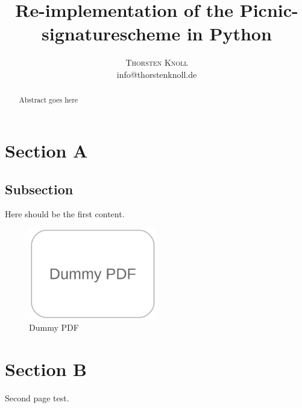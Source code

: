 \documentclass[twoside]{article}
\title{\vspace{-7mm}%
	\fontsize{24pt}{10pt}\selectfont
	\textbf{Re-implementation of the Picnic-signaturescheme in Python}
	}
\author{%
	\large
	\textsc{Thorsten Knoll} \\[2mm]
	\normalsize	info@thorstenknoll.de
	\vspace{-5mm}
	}
\date{}
\begin{document}
\maketitle
\thispagestyle{fancy}

\begin{abstract}
\noindent Abstract goes here
\end{abstract}

\section{Section A}
\subsection{Subsection}
Here should be the first content.
\begin{figure}[htbp]
\center
\includegraphics[width=0.5\textwidth]{pics/dummy.pdf}
\caption{Dummy PDF}
\label{fig:dummy}
\end{figure}
\newpage

\section{Section B}
Second page test.



\end{document}
